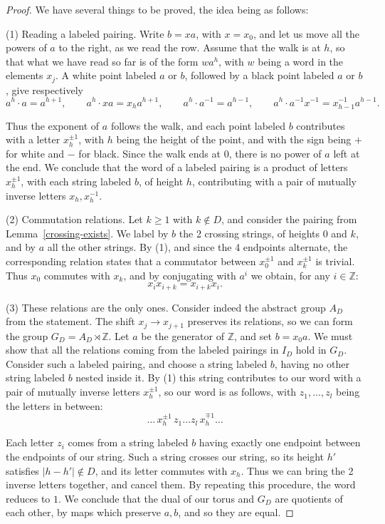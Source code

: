 \documentclass[11pt,a4paper]{article}
\begin{document}
\begin{proof}
We have several things to be proved, the idea being as follows:

(1) Reading a labeled pairing. Write $b=xa$, with $x=x_0$, and let us move all the powers of $a$ to the right, as we read the row. Assume that the walk is at $h$, so that what we have read so far is of the form $wa^h$, with $w$ being a word in the elements $x_j$. A white point labeled $a$ or $b$, followed by a black point labeled $a$ or $b$, give respectively
\[
 a^h\cdot a=a^{h+1},\qquad a^h\cdot xa=x_ha^{h+1},\qquad a^h\cdot a^{-1}=a^{h-1},\qquad a^h\cdot a^{-1}x^{-1}=x_{h-1}^{-1}a^{h-1}.
\]

Thus the exponent of $a$ follows the walk, and each point labeled $b$ contributes with a letter $x_h^{\pm1}$, with $h$ being the height of the point, and with the sign being $+$ for white and $-$ for black. Since the walk ends at $0$, there is no power of $a$ left at the end. We conclude that the word of a labeled pairing is a product of letters $x_h^{\pm1}$, with each string labeled $b$, of height $h$, contributing with a pair of mutually inverse letters $x_h,x_h^{-1}$.

(2) Commutation relations. Let $k\geq1$ with $k\notin D$, and consider the pairing from Lemma~\ref{crossing-exists}. We label by $b$ the 2 crossing strings, of heights $0$ and $k$, and by $a$ all the other strings. By (1), and since the 4 endpoints alternate, the corresponding relation states that a commutator between $x_0^{\pm1}$ and $x_k^{\pm1}$ is trivial. Thus $x_0$ commutes with $x_k$, and by conjugating with $a^i$ we obtain, for any $i\in\mathbb Z$:
\[
 x_ix_{i+k}=x_{i+k}x_i.
\]

(3) These relations are the only ones. Consider indeed the abstract group $A_D$ from the statement. The shift $x_j\to x_{j+1}$ preserves its relations, so we can form the group $G_D=A_D\rtimes\mathbb Z$. Let $a$ be the generator of $\mathbb Z$, and set $b=x_0a$. We must show that all the relations coming from the labeled pairings in $I_D$ hold in $G_D$. Consider such a labeled pairing, and choose a string labeled $b$, having no other string labeled $b$ nested inside it. By (1) this string contributes to our word with a pair of mutually inverse letters $x_h^{\pm1}$, so our word is as follows, with $z_1,\ldots,z_l$ being the letters in between:
\[
 \ldots\,x_h^{\pm1}\,z_1\ldots z_l\,x_h^{\mp1}\ldots
\]

Each letter $z_i$ comes from a string labeled $b$ having exactly one endpoint between the endpoints of our string. Such a string crosses our string, so its height $h'$ satisfies $|h-h'|\notin D$, and its letter commutes with $x_h$. Thus we can bring the 2 inverse letters together, and cancel them. By repeating this procedure, the word reduces to $1$. We conclude that the dual of our torus and $G_D$ are quotients of each other, by maps which preserve $a,b$, and so they are equal.


\end{proof}
\end{document}
